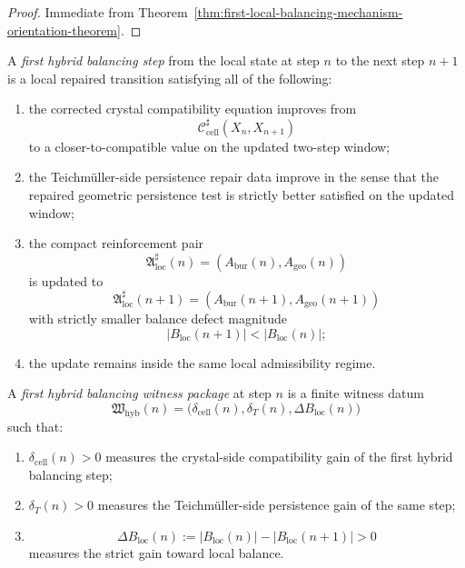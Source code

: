 \begin{proof}
Immediate from Theorem~\ref{thm:first-local-balancing-mechanism-orientation-theorem}.
\end{proof}


\begin{definition}
\label{def:first-hybrid-balancing-step}
A \emph{first hybrid balancing step} from the local state at step \(n\) to the next step \(n+1\) is a local repaired transition satisfying all of the following:
\begin{enumerate}[leftmargin=2em,label=(\alph*)]
 \item the corrected crystal compatibility equation improves from
 \[
 \mathcal C_{\mathrm{cell}}^{\sharp}(X_n,X_{n+1})
 \]
 to a closer-to-compatible value on the updated two-step window;
 \item the Teichm\"uller-side persistence repair data improve in the sense that the repaired geometric persistence test is strictly better satisfied on the updated window;
 \item the compact reinforcement pair
 \[
 \mathfrak A_{\mathrm{loc}}^{\sharp}(n)=(A_{\mathrm{bur}}(n),A_{\mathrm{geo}}(n))
 \]
 is updated to
 \[
 \mathfrak A_{\mathrm{loc}}^{\sharp}(n+1)=(A_{\mathrm{bur}}(n+1),A_{\mathrm{geo}}(n+1))
 \]
 with strictly smaller balance defect magnitude
 \[
 |B_{\mathrm{loc}}(n+1)|<|B_{\mathrm{loc}}(n)|;
 \]
 \item the update remains inside the same local admissibility regime.
\end{enumerate}
\end{definition}

\begin{definition}
\label{def:first-hybrid-balancing-witness-package}
A \emph{first hybrid balancing witness package} at step \(n\) is a finite witness datum
\[
 \mathfrak W_{\mathrm{hyb}}(n)
 =
 \bigl(
 \delta_{\mathrm{cell}}(n),
 \delta_{T}(n),
 \Delta B_{\mathrm{loc}}(n)
 \bigr)
\]
such that:
\begin{enumerate}[leftmargin=2em,label=(\alph*)]
 \item \(\delta_{\mathrm{cell}}(n)>0\) measures the crystal-side compatibility gain of the first hybrid balancing step;
 \item \(\delta_{T}(n)>0\) measures the Teichm\"uller-side persistence gain of the same step;
 \item
 \[
 \Delta B_{\mathrm{loc}}(n)
 :=
 |B_{\mathrm{loc}}(n)|-|B_{\mathrm{loc}}(n+1)|
 >0
 \]
 measures the strict gain toward local balance.
\end{enumerate}
\end{definition}

